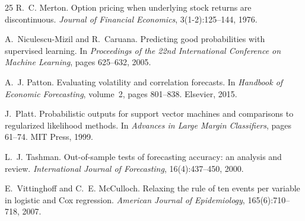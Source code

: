 \documentclass[11pt,a4paper]{article}
\begin{document}
\begin{thebibliography}{25}
R.~C. Merton.
\newblock Option pricing when underlying stock returns are discontinuous.
\newblock \emph{Journal of Financial Economics}, 3(1-2):125--144, 1976.

A.~Niculescu-Mizil and R.~Caruana.
\newblock Predicting good probabilities with supervised learning.
\newblock In \emph{Proceedings of the 22nd International Conference on Machine Learning}, pages 625--632, 2005.

A.~J. Patton.
\newblock Evaluating volatility and correlation forecasts.
\newblock In \emph{Handbook of Economic Forecasting}, volume~2, pages 801--838. Elsevier, 2015.

J.~Platt.
\newblock Probabilistic outputs for support vector machines and comparisons to regularized likelihood methods.
\newblock In \emph{Advances in Large Margin Classifiers}, pages 61--74. MIT Press, 1999.

L.~J. Tashman.
\newblock Out-of-sample tests of forecasting accuracy: an analysis and review.
\newblock \emph{International Journal of Forecasting}, 16(4):437--450, 2000.

E.~Vittinghoff and C.~E. McCulloch.
\newblock Relaxing the rule of ten events per variable in logistic and {Cox} regression.
\newblock \emph{American Journal of Epidemiology}, 165(6):710--718, 2007.

\end{thebibliography}
\end{document}
